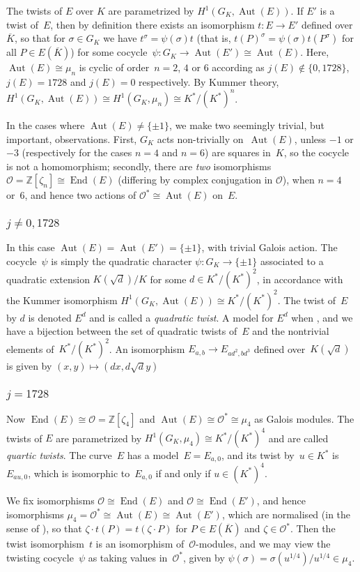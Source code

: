 \documentclass[12pt, reqno]{amsart}
\newcommand{\Z}{\mathbb{Z}}
\newcommand{\Kbar}{{\overline{K}}}
\newcommand{\calO}{\mathcal{O}}
\DeclareMathOperator{\Aut}{Aut}
\DeclareMathOperator{\End}{End}
\numberwithin{equation}{section}
\theoremstyle{definition}
\theoremstyle{remark}
\begin{document}
The twists of $E$ over $K$ are parametrized by $H^1(G_K,\Aut(E))$.  If
$E'$ is a twist of~$E$, then by definition there exists an isomorphism
$t:E\to E'$ defined over $\Kbar$, so that for $\sigma\in G_K$ we have
$t^{\sigma}=\psi(\sigma)t$ (that is,
$t(P)^{\sigma}=\psi(\sigma)t(P^\sigma)$ for all $P\in E(\Kbar)$) for
some cocycle~$\psi:G_K\to\Aut(E')\cong\Aut(E)$.  Here,
$\Aut(E)\cong\mu_n$ is cyclic of order~$n=2$, $4$ or $6$ according as
$j(E)\not\in\{0,1728\}$, $j(E)=1728$ and $j(E)=0$ respectively.  By
Kummer theory, $H^1(G_K,\Aut(E))\cong H^1(G_K,\mu_n)\cong
K^*/(K^*)^n$.

In the cases where $\Aut(E)\not=\{\pm1\}$, we make two seemingly
trivial, but important, observations. First, $G_K$ acts non-trivially
on~$\Aut(E)$, unless $-1$ or $-3$ (respectively for the cases $n=4$
and $n=6$) are squares in~$K$, so the cocycle is not a homomorphism;
secondly, there are \emph{two} isomorphisms
$\calO=\Z[\zeta_n]\cong\End(E)$ (differing by complex conjugation in
$\calO$), when $n=4$ or~$6$, and hence two actions of
$\calO^*\cong\Aut(E)$ on~$E$.

\subsubsection{$j\not=0,1728$}
In this case $\Aut(E)=\Aut(E')=\{\pm1\}$, with trivial Galois
action. The cocycle~$\psi$ is simply the quadratic character
$\psi:G_K\to\{\pm1\}$ associated to a quadratic extension
$K(\sqrt{d})/K$ for some $d\in K^*/(K^*)^2$, in accordance with the
Kummer isomorphism $H^1(G_K,\Aut(E))\cong K^*/(K^*)^2$.  The twist
of~$E$ by $d$ is denoted $E^d$ and is called a \emph{quadratic twist}.
A model for $E^d$ when , and we have a bijection between the set of
quadratic twists of~$E$ and the nontrivial elements
of~$K^*/(K^*)^2$. An isomorphism $E_{a,b}\to E_{ad^2,bd^3}$ defined
over~$K(\sqrt{d})$ is given by $(x,y) \mapsto (dx,d\sqrt{d}y)$

\subsubsection{$j=1728$}
Now $\End(E)\cong\calO=\Z[\zeta_4]$ and
$\Aut(E)\cong\calO^*\cong\mu_4$ as Galois modules.  The twists of $E$
are parametrized by $H^1(G_K,\mu_4)\cong K^*/(K^*)^4$ and are called
\emph{quartic twists}.  The curve~$E$ has a model~$E=E_{a,0}$, and its
twist by~$u\in K^*$ is $E_{au,0}$, which is isomorphic to~$E_{a,0}$ if
and only if $u\in (K^*)^4$.

We fix isomorphisms $\calO\cong\End(E)$ and $\calO\cong\End(E')$, and
hence isomorphisms $\mu_4=\calO^*\cong\Aut(E)\cong\Aut(E')$, which are
normalised (in the sense of \cite[Prop.~I.1.1]{SilvermanII}), so that
$\zeta\cdot t(P)=t(\zeta\cdot P)$ for $P\in E(\Kbar)$ and
$\zeta\in\calO^*$. Then the twist isomorphism~$t$ is an isomorphism
of~$\calO$-modules, and we may view the twisting cocycle~$\psi$ as
taking values in~$\calO^*$, given by $\psi(\sigma) =
\sigma(u^{1/4})/u^{1/4} \in \mu_4$.
\end{document}
